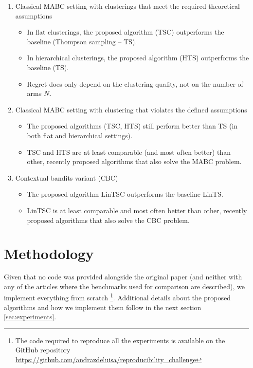 \begin{enumerate}[1)]
  \item Classical MABC setting with clusterings that meet the required theoretical assumptions
        \begin{itemize}
            \item In flat clusterings, the proposed algorithm (TSC) outperforms the baseline (Thompson sampling -- TS).
            \item In hierarchical clusterings, the proposed algorithm (HTS) outperforms the baseline (TS).
            \item Regret does only depend on the clustering quality, not on the number of arms $N$.
        \end{itemize}
  \item Classical MABC setting with clustering that violates the defined assumptions
        \begin{itemize}
            \item The proposed algorithms (TSC, HTS) still perform better than TS (in both flat and hierarchical settings).
            \item TSC and HTS are at least comparable (and most often better) than other, recently proposed algorithms that also solve the MABC problem.
        \end{itemize}
  \item Contextual bandits variant (CBC)
        \begin{itemize}
            \item The proposed algorithm LinTSC outperforms the baseline LinTS.
            \item LinTSC is at least comparable and most often better than other, recently proposed algorithms that also solve the CBC problem.
        \end{itemize}
\end{enumerate}

\section{Methodology}

Given that no code was provided alongside the original paper (and neither with any of the articles where the benchmarks used for comparison are described), we implement everything from scratch \footnote{The code required to reproduce all the experiments is available on the GitHub repository \url{https://github.com/andrazdeluisa/reproducibility_challenge}}. Additional details about the proposed algorithms and how we implement them follow in the next section \ref{sec:experiments}.

